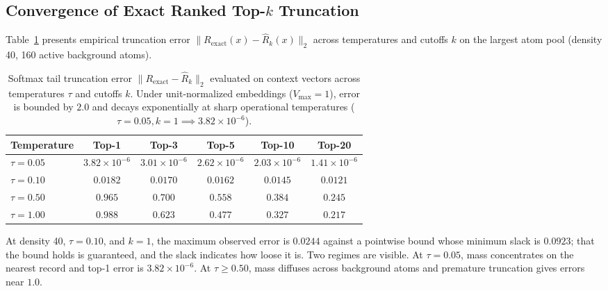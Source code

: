 \documentclass[preprint,12pt]{elsarticle}
\newif\ifmarkchanges
\newcommand{\rev}[1]{\ifmarkchanges{\color{blue}#1}\else#1\fi}
\begin{document}
\subsection{Convergence of Exact Ranked Top-\texorpdfstring{$k$}{k} Truncation}

Table~\ref{tab:truncation_error} presents empirical truncation error $\| R_{\mathrm{exact}}(x) - \hat{R}_k(x) \|_2$ across temperatures and cutoffs $k$ on the largest atom pool (density 40, 160 active background atoms).

\begin{table}[t]
\centering
\caption{Softmax tail truncation error $\| R_{\mathrm{exact}} - \hat{R}_k \|_2$ evaluated on context vectors across temperatures $\tau$ and cutoffs $k$. Under unit-normalized embeddings ($V_{\max}=1$), error is bounded by $2.0$ and decays exponentially at sharp operational temperatures ($\tau = 0.05, k=1 \implies 3.82 \times 10^{-6}$).}
\label{tab:truncation_error}
\vspace{0.5em}
\footnotesize
\begin{tabular}{@{}lccccc@{}}
\toprule
Temperature & Top-1 & Top-3 & Top-5 & Top-10 & Top-20 \\
\midrule
$\tau = 0.05$ & $3.82 \times 10^{-6}$ & $3.01 \times 10^{-6}$ & $2.62 \times 10^{-6}$ & $2.03 \times 10^{-6}$ & $1.41 \times 10^{-6}$ \\
$\tau = 0.10$ & $0.0182$ & $0.0170$ & $0.0162$ & $0.0145$ & $0.0121$ \\
$\tau = 0.50$ & $0.965$ & $0.700$ & $0.558$ & $0.384$ & $0.245$ \\
$\tau = 1.00$ & $0.988$ & $0.623$ & $0.477$ & $0.327$ & $0.217$ \\
\bottomrule
\end{tabular}
\end{table}

At density 40, $\tau=0.10$, and $k=1$, the maximum observed error is $0.0244$ \rev{against a pointwise bound whose minimum slack is $0.0923$; that the bound holds is guaranteed, and the slack indicates how loose it is.} Two regimes are visible. At $\tau = 0.05$, mass concentrates on the nearest record and top-1 error is $3.82 \times 10^{-6}$. At $\tau \ge 0.50$, mass diffuses across background atoms and premature truncation gives errors near $1.0$.
\end{document}
